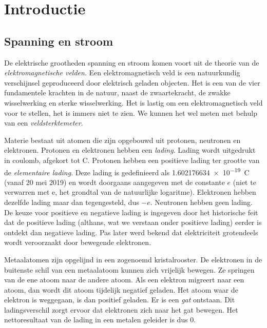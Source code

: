 \chapter{Introductie}
\label{cha:introductie}


\section{Spanning en stroom}
De elektrische grootheden spanning en stroom komen voort uit de theorie van de \textsl{elektromagnetische velden}. Een elektromagnetisch veld is een natuurkundig verschijnsel geproduceerd door elektrisch geladen objecten. Het is een van de vier fundamentele krachten in de natuur, naast de zwaartekracht, de zwakke wisselwerking en sterke wisselwerking. Het is lastig om een elektromagnetisch veld voor te stellen, het is immers niet te zien. We kunnen het wel meten met behulp van een \textsl{veldsterktemeter}.

Materie bestaat uit atomen die zijn opgebouwd uit protonen, neutronen en elektronen. Protonen en elektronen hebben een \textsl{lading}. Lading wordt uitgedrukt in coulomb, afgekort tot \si{\coulomb}. Protonen hebben een positieve lading ter grootte van de \textsl{elementaire lading}. Deze lading is gedefinieerd als \SI{1.602176634e-19}{\coulomb} (vanaf 20 mei 2019) en wordt doorgaans aangegeven met de constante $e$ (niet te verwarren met e, het grondtal van de natuurlijke logaritme). Elektronen hebben dezelfde lading maar dan tegengesteld, dus $-e$. Neutronen hebben geen lading. De keuze voor positieve en negatieve lading is ingegeven door het historische feit dat de positieve lading (althans, wat we verstaan onder positieve lading) eerder is ontdekt dan negatieve lading. Pas later werd bekend dat elektriciteit grotendeels wordt veroorzaakt door bewegende elektronen.

Metaalatomen zijn opgelijnd in een zogenoemd kristalrooster. De elektronen in de buitenste schil van een metaalatoom kunnen zich vrijelijk bewegen. Ze springen van de ene atoom naar de andere atoom. Als een elektron migreert naar een atoom, dan wordt dit atoom tijdelijk negatief geladen. Het atoom waar de elektron is weggegaan, is dan positief geladen. Er is een \textsl{gat} ontstaan. Dit ladingsverschil zorgt ervoor dat elektronen zich naar het gat bewegen. Het nettoresultaat van de lading in een metalen geleider is dus 0.


